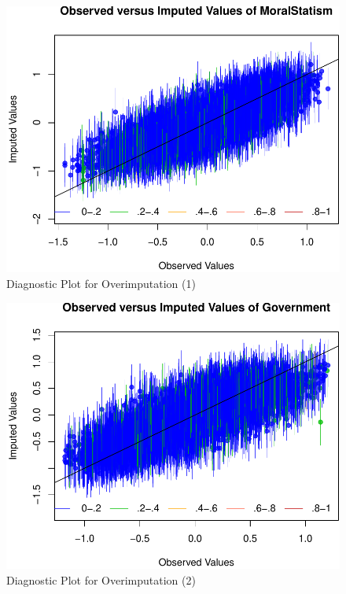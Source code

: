 \documentclass[12pt,]{article}
\begin{document}
\begin{figure}[htbp]
\centering
\includegraphics{figures/missing4-1.pdf}
\caption{Diagnostic Plot for Overimputation (1)}
\end{figure}

\begin{figure}[htbp]
\centering
\includegraphics{figures/missing5-1.pdf}
\caption{Diagnostic Plot for Overimputation (2)}
\end{figure}

\clearpage
\end{document}

